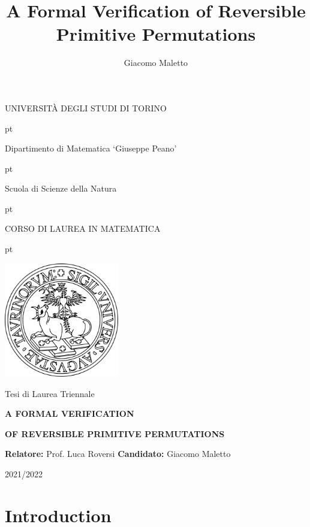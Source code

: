 \documentclass{book}
\title{A Formal Verification of Reversible Primitive Permutations}
\author{Giacomo Maletto}
\date{}
\theoremstyle{definition}
\theoremstyle{remark}
\theoremstyle{plain}
\begin{document}

\frontmatter

\thispagestyle{empty}

\centerline {\Large{\textsc{ UNIVERSIT\`A DEGLI STUDI DI TORINO}}}
 pt

\centerline {\Large{\textsc Dipartimento di Matematica `Giuseppe Peano'}}

 pt

\centerline {{\textsc Scuola di Scienze della Natura}}

 pt

\centerline {\Large{\textsc CORSO DI LAUREA IN MATEMATICA}}

 pt


\centerline {\includegraphics[width=5cm]{Immagini/logo.png}}


\vskip 1.2cm

\centerline {\normalsize {Tesi di Laurea Triennale}} 

\vskip 0.7cm

\centerline {\Large {\bf A FORMAL VERIFICATION}}

\vskip 0.3cm

\centerline {\Large {\bf OF REVERSIBLE PRIMITIVE PERMUTATIONS}}

\vskip 1.4cm

\noindent \textbf{Relatore:} Prof. Luca Roversi
\hfill  {\textbf{Candidato:} Giacomo Maletto }

\vskip 2.5cm

\centerline{2021/2022}

\mainmatter

\tableofcontents

\chapter*{Introduction}
\end{document}
